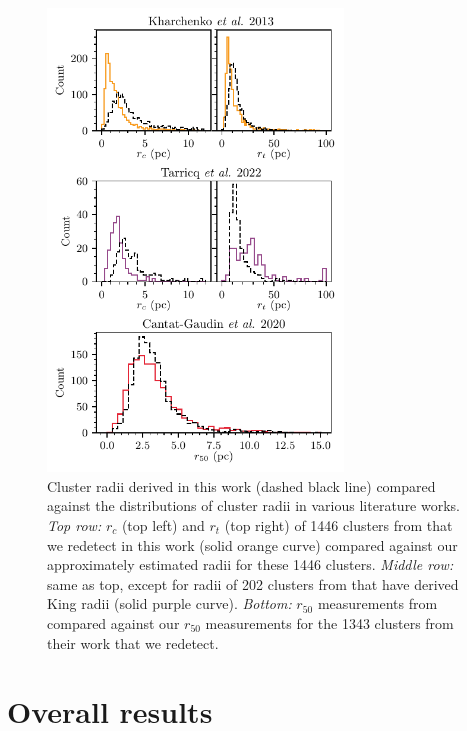 \begin{figure}[p]
   \centering
   \includegraphics[width=0.7\textwidth]{fig/c3/fig_results_radii.pdf}
   \caption[Cluster radii derived in this work compared against the distributions of cluster radii in various literature works]{Cluster radii derived in this work (dashed black line) compared against the distributions of cluster radii in various literature works. \emph{Top row:} $r_c$ (top left) and $r_t$ (top right) of 1446 clusters from \cite{kharchenko_global_2013} that we redetect in this work (solid orange curve) compared against our approximately estimated \cite{king_structure_1962} radii for these 1446 clusters. \emph{Middle row:} same as top, except for radii of 202 clusters from \cite{tarricq_structural_2022} that have derived King radii (solid purple curve). \emph{Bottom:} $r_{50}$ measurements from \cite{cantat-gaudin_clusters_2020} compared against our $r_{50}$ measurements for the 1343 clusters from their work that we redetect.}%
   \label{c3:fig:radius_distributions}
\end{figure}

\section{Overall results}\label{c3:sec:results-overall}

